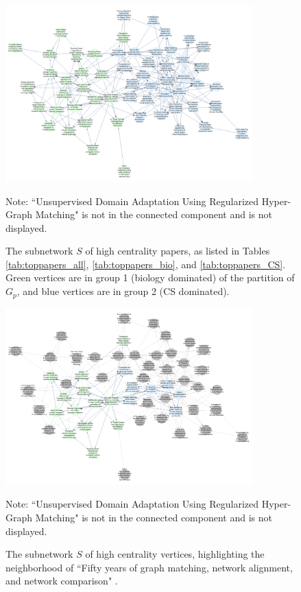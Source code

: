 \documentclass[12pt]{thesis}
\theoremstyle{plain}
\theoremstyle{definition}
\theoremstyle{remark}
\begin{document}
\begin{figure}
\centering
\includegraphics[width=0.85\textwidth]{reading_list0pt9crop.png}
\caption{The subnetwork $S$ of high centrality papers, as listed in Tables \ref{tab:toppapers_all}, \ref{tab:toppapers_bio}, and \ref{tab:toppapers_CS}. Green vertices are in group 1 (biology dominated) of the partition of $G_p$, and blue vertices are in group 2 (CS dominated).}
\vspace{-12pt}\flushleft\scriptsize Note: ``Unsupervised Domain Adaptation Using Regularized Hyper-Graph Matching" is not in the connected component and is not displayed.
\label{fig:reading_list}
\end{figure}

\begin{figure}
\centering
\includegraphics[width=0.85\textwidth]{reading_list_neighborhood0pt9crop.png}
\caption{The subnetwork $S$ of high centrality vertices, highlighting the neighborhood of ``Fifty years of graph matching, network alignment, and network comparison" \cite{Emmert_Streib_2016}.}
\vspace{-12pt}\flushleft\scriptsize Note: ``Unsupervised Domain Adaptation Using Regularized Hyper-Graph Matching" is not in the connected component and is not displayed.
\label{fig:reading_list_neighborhood}
\end{figure}
\end{document}
